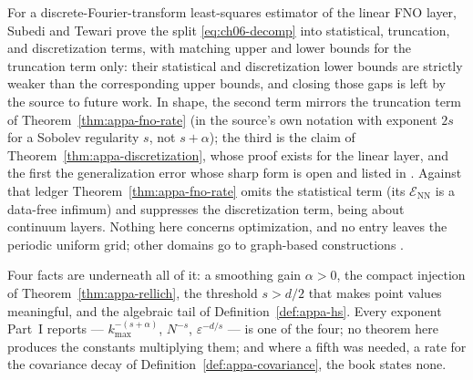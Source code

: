 \begin{remark}\label{rem:appa-three-way}
For a discrete-Fourier-transform least-squares estimator of the linear FNO layer,
Subedi and Tewari \cite{subedi2024controlling} prove the split
\eqref{eq:ch06-decomp} into statistical, truncation, and discretization terms, with matching
upper and lower bounds for the truncation term only: their statistical and discretization
lower bounds are strictly weaker than the corresponding upper bounds, and closing those gaps
is left by the source to future work. In shape, the second term mirrors
the truncation term of Theorem~\ref{thm:appa-fno-rate} (in the source's own notation with
exponent $2s$ for a Sobolev regularity $s$, not $s+\alpha$); the third is
the claim of Theorem~\ref{thm:appa-discretization}, whose proof exists for the linear layer,
and the first the generalization error whose sharp form is
open and listed in . Against that
ledger Theorem~\ref{thm:appa-fno-rate} omits the statistical term (its
$\mathcal{E}_{\text{NN}}$ is a data-free infimum) and suppresses the discretization term,
being about continuum layers. Nothing here concerns optimization, and no entry leaves the periodic uniform grid;
other domains go to graph-based constructions \cite{li2023geometry}.
\end{remark}

Four facts are underneath all of it: a smoothing gain $\alpha > 0$, the compact injection of
Theorem~\ref{thm:appa-rellich}, the threshold $s > d/2$ that makes point values meaningful,
and the algebraic tail of Definition~\ref{def:appa-hs}. Every exponent Part~I reports ---
$k_{\max}^{-(s+\alpha)}$, $N^{-s}$, $\varepsilon^{-d/s}$ --- is one of the four; no theorem here
produces the constants multiplying them; and where a fifth was needed, a rate for the
covariance decay of Definition~\ref{def:appa-covariance}, the book states none.
